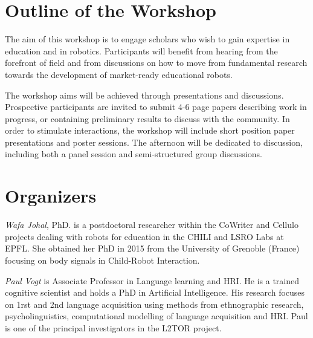 \documentclass{sig-alternate-05-2015}
\begin{document}

\section{Outline of the Workshop}
The aim of this workshop is to engage scholars who wish to gain expertise in 
education and in robotics. Participants will benefit from hearing from the 
forefront of field and from discussions on how to move from fundamental research 
towards the development of market-ready educational robots.

The workshop aims will be achieved through presentations and discussions. 
Prospective participants are invited to submit 4-6 page papers describing work in progress, or containing preliminary results to discuss with the community.
In order to stimulate interactions, the workshop will include short position paper presentations and poster sessions. 
The afternoon will be dedicated to discussion, including both a panel session and semi-structured group discussions.


\section{Organizers}
\emph{Wafa Johal}, PhD. is a postdoctoral researcher within the CoWriter and Cellulo projects dealing with robots for education in the CHILI and LSRO Labs at EPFL. She obtained her PhD in 2015 from the University of Grenoble (France) focusing on body signals in Child-Robot Interaction.  

\emph{Paul Vogt} is Associate Professor in Language learning and HRI. He is a trained cognitive scientist and holds a PhD in Artificial Intelligence. His research focuses on 1rst and 2nd language acquisition using methods from ethnographic research, psycholinguistics, computational modelling of language acquisition and HRI. Paul is one of the principal investigators in the L2TOR project.
\end{document}
